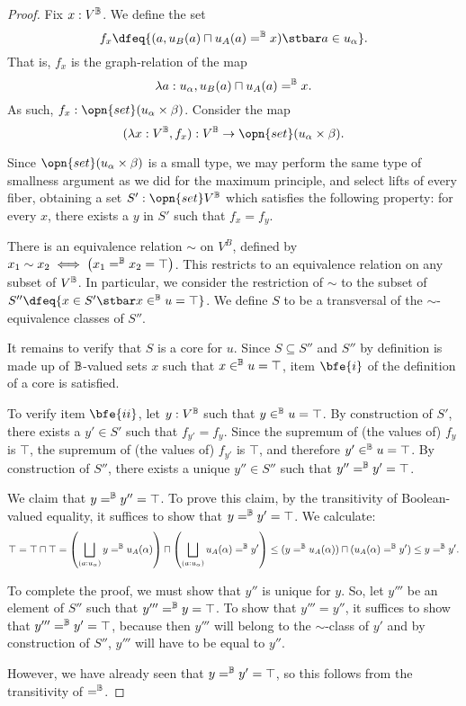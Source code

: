 \documentclass[11pt]{article}
\newcommand{\set}{\opn{set}}
\begin{document}
\begin{proof}
  Fix $x : V^{\mathbb{B}}$. We define the set
  $$
  f_x \dfeq \{(a, u_B (a) \sqcap u_A (a)  =^\B x) \stbar a \in u_{\alpha}\}.
  $$
  That is, $f_x$ is the graph-relation of the map
  $$
\lambda a : u_{\alpha}, u_B (a) \sqcap u_A (a) =^{\mathbb{B}} x.
$$
As such, $f_x : \opn{set} (u_{\alpha} \times \beta)$. Consider the map
$$
(\lambda x : V^\B, f_x) : V^\B \to \opn{set}(u_{\alpha} \times \beta).
$$

Since $\opn{set}(u_{\alpha} \times \beta)$ is a small type, we may perform the same type of smallness argument as we did for the maximum principle, and select lifts of every fiber, obtaining a set $S' : \set V^\B$ which satisfies the following property: for every $x$, there exists a $y$ in $S'$ such that $f_x = f_y$.

There is an equivalence relation $\sim$ on $V^B$, defined by $x_1 \sim x_2 \iff \left(x_1 =^{\mathbb{B}} x_2 = \top\right)$. This restricts to an equivalence relation on any subset of $V^{\mathbb{B}}$. In particular, we consider the restriction of $\sim$ to the subset of $S'' \dfeq \{x \in S' \stbar x \in^\B u = \top\}$. We define $S$ to be a transversal of the $\sim$-equivalence classes of $S''$.

It remains to verify that $S$ is a core for $u$. Since $S \subseteq S''$ and $S''$ by definition is made up of $\mathbb{B}$-valued sets $x$ such that $x \in^{\mathbb{B}} u = \top$, item $\bfe{i}$ of the definition of a core is satisfied.

To verify item $\bfe{ii}$, let $y : V^{\mathbb{B}}$ such that $y \in^{\mathbb{B}} u = \top$. By construction of $S'$, there exists a $y' \in S'$ such that $f_{y'} = f_y$. Since the supremum of (the values of) $f_y$ is $\top$, the supremum of (the values of) $f_{y'}$ is $\top$, and therefore $y' \in^{\mathbb{B}} u = \top$. By construction of $S''$, there exists a unique $y'' \in S''$ such that $y'' =^{\mathbb{B}} y' = \top$.

We claim that $y =^{\mathbb{B}} y'' = \top$. To prove this claim, by the transitivity of Boolean-valued equality, it suffices to show that $y =^{\mathbb{B}} y' = \top$. We calculate:
$$
\top = \top \sqcap \top = \left(\bigsqcup_{(a : u_{\alpha})} y =^{\mathbb{B}} u_A(\alpha) \right) \sqcap \left(\bigsqcup_{(a : u_{\alpha})} u_{A}(\alpha) =^{\mathbb{B}} y' \right) \leq (y =^{\mathbb{B}} u_A(\alpha)) \sqcap (u_A(\alpha) =^{\mathbb{B}} y') \leq y=^{\mathbb{B}} y'.
$$

To complete the proof, we must show that $y''$ is unique for $y$. So, let $y'''$ be an element of $S''$ such that $y''' =^{\mathbb{B}} y = \top$. To show that $y''' = y''$, it suffices to show that $y''' =^{\mathbb{B}} y' = \top$, because then $y'''$ will belong to the $\sim$-class of $y'$ and by construction of $S''$, $y'''$ will have to be equal to $y''$.

However, we have already seen that $y =^{\mathbb{B}} y' = \top$, so this follows from the transitivity of $=^{\mathbb{B}}$.

\end{proof}
\end{document}
